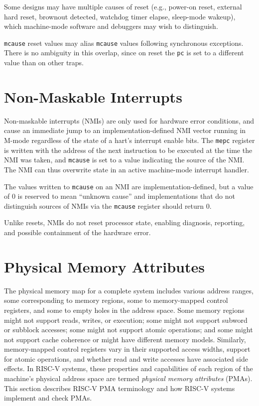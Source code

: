 \begin{commentary}
Some designs may have multiple causes of reset (e.g., power-on reset,
external hard reset, brownout detected, watchdog timer elapse,
sleep-mode wakeup), which machine-mode software and debuggers may wish
to distinguish.

{\tt mcause} reset values may alias {\tt mcause} values following
synchronous exceptions.  There is no ambiguity in this overlap, since
on reset the {\tt pc} is set to a different value than on other traps.
\end{commentary}

\section{Non-Maskable Interrupts}
\label{sec:nmi}

Non-maskable interrupts (NMIs) are only used for hardware error
conditions, and cause an immediate jump to an implementation-defined
NMI vector running in M-mode regardless of the state of a hart's
interrupt enable bits.  The {\tt mepc} register is written with the
address of the next instruction to be executed at the time the NMI was
taken, and {\tt mcause} is set to a value indicating the source of the
NMI.  The NMI can thus overwrite state in an active machine-mode
interrupt handler.

The values written to {\tt mcause} on an NMI are
implementation-defined, but a value of 0 is reserved to mean ``unknown
cause'' and implementations that do not distinguish sources of NMIs
via the {\tt mcause} register should return 0.

Unlike resets, NMIs do not reset processor state, enabling diagnosis,
reporting, and possible containment of the hardware error.

\section{Physical Memory Attributes}
\label{sec:pma}

The physical memory map for a complete system includes various address
ranges, some corresponding to memory regions, some to memory-mapped
control registers, and some to empty holes in the address space.  Some
memory regions might not support reads, writes, or execution; some
might not support subword or subblock accesses; some might not support
atomic operations; and some might not support cache coherence or might
have different memory models.  Similarly, memory-mapped control
registers vary in their supported access widths, support for atomic
operations, and whether read and write accesses have associated side
effects.  In RISC-V systems, these properties and capabilities of each
region of the machine's physical address space are termed {\em
  physical memory attributes} (PMAs).  This section describes RISC-V
PMA terminology and how RISC-V systems implement and check PMAs.

